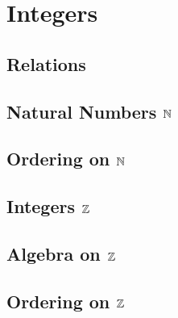 \chapter{Integers}

\section{Relations}

\section{\texorpdfstring{Natural Numbers $\mathbb{N}$}{Natural Numbers N}}




\section{\texorpdfstring{Ordering on $\mathbb{N}$}{Ordering on N}}

\section{\texorpdfstring{Integers $\mathbb{Z}$}{Integers Z}}

\section{\texorpdfstring{Algebra on $\mathbb{Z}$}{Algebra on Z}}

\section{\texorpdfstring{Ordering on $\mathbb{Z}$}{Ordering on Z}}
